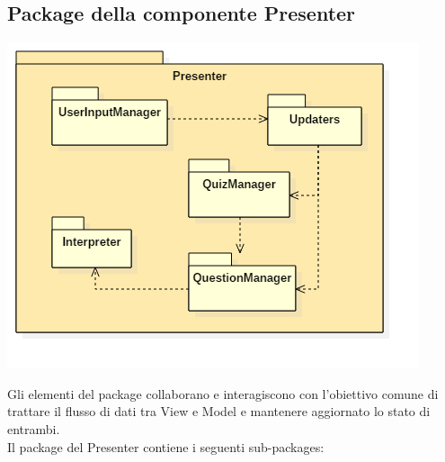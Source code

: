 \documentclass[a4paper,11pt]{article}
\begin{document}
	\subsection{Package della componente Presenter}
	\begin{center}
		\includegraphics[scale=0.6]{../images/PresenterPackage.png}
	\end{center}
	Gli elementi del package collaborano e interagiscono con l'obiettivo comune di trattare il flusso di dati tra View e Model e mantenere aggiornato lo stato di entrambi. \\
	Il package del Presenter contiene i seguenti sub-packages:
\end{document}
